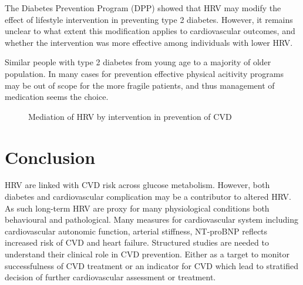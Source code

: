 \documentclass[
  a4paper,
  headsepline=true,
  open=any]{scrbook}
\begin{document}
The Diabetes Prevention Program (DPP) showed that HRV may modify the
effect of lifestyle intervention in preventing type 2 diabetes. However,
it remains unclear to what extent this modification applies to
cardiovascular outcomes, and whether the intervention was more effective
among individuals with lower HRV.

Similar people with type 2 diabetes from young age to a majority of
older population. In many cases for prevention effective physical
acitivity programs may be out of scope for the more fragile patients,
and thus management of medication seems the choice.

\begin{figure}

\begin{minipage}[t]{\linewidth}

{\centering 


\caption{Mediation of HRV by intervention in prevention of CVD}

}

\end{minipage}%

\end{figure}


\hypertarget{conclusion}{%
\chapter{Conclusion}\label{conclusion}}

HRV are linked with CVD risk across glucose metabolism. However, both
diabetes and cardiovascular complication may be a contributor to altered
HRV. As such long-term HRV are proxy for many physiological conditions
both behavioural and pathological. Many measures for cardiovascular
system including cardiovascular autonomic function, arterial stiffness,
NT-proBNP reflects increased risk of CVD and heart failure. Structured
studies are needed to understand their clinical role in CVD prevention.
Either as a target to monitor successfulness of CVD treatment or an
indicator for CVD which lead to stratified decision of further
cardiovascular assessment or treatment.
\end{document}
